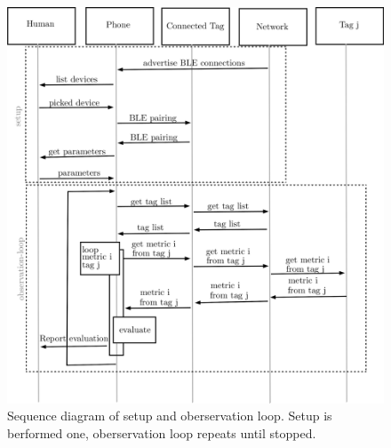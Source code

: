 \begin{figure}[ht!]
\includegraphics[width=\linewidth]{graphics/schematics/obervation_loop.png}
 \caption{Sequence diagram of setup and oberservation loop. Setup is berformed one, oberservation loop repeats until stopped.}
\label{f:observation_loop}
\end{figure}

